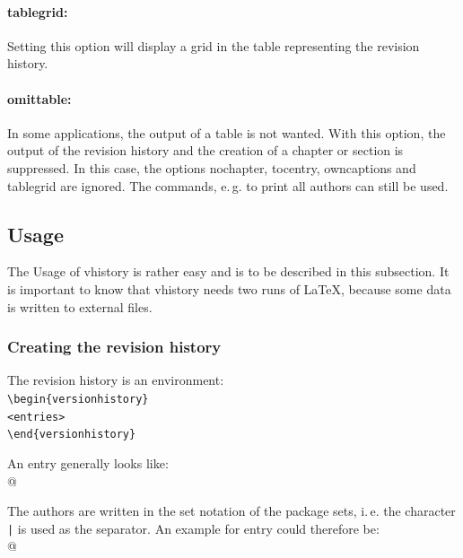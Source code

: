 \paragraph{tablegrid:} Setting this option will display a grid in the table representing the revision history.

\paragraph{omittable:} In some applications, the output of a table is not wanted. With this option, the output of the revision history and the creation of a chapter or section is suppressed. In this case, the options nochapter, tocentry, owncaptions and tablegrid are ignored. The commands, e.\,g. to print all authors can still be used.

\subsection{Usage}\label{usage}
The Usage of vhistory is rather easy and is to be described in this subsection.
It is important to know that vhistory needs two runs of \LaTeX, because some data is written to external files.

\subsubsection{Creating the revision history}\label{begin}
The revision history is an environment:\\
\mbox{}\hspace{2em}\verb|\begin{versionhistory}|\\
\mbox{}\hspace{2em}\verb|<entries>|\\
\mbox{}\hspace{2em}\verb|\end{versionhistory}|

An entry generally looks like:\\
\mbox{}\hspace{2em}\verb@{}@

The authors are written in the set notation of the package sets, i.\,e. the character \texttt{|} is used as the separator. An example for entry could therefore be:\\
\mbox{}\hspace{2em}\verb@{}@

